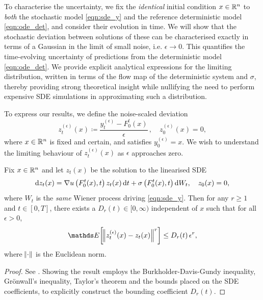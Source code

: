 To characterise the uncertainty, we fix the {\em identical} initial condition \(x  \in \mathbb{R}^n\) to {\em both} the stochastic model \eqref{eqn:sde_y} and the reference deterministic model \eqref{eqn:ode_det}, and consider their evolution in time.  We will show that the stochastic deviation between solutions of these can be characterised exactly in terms of a Gaussian in the limit of small noise, i.e. \(\epsilon \rightarrow 0\).  
This quantifies the time-evolving uncertainty of predictions from the deterministic model \eqref{eqn:ode_det}.
We provide explicit analytical expressions for the limiting distribution, written in terms of the flow map of the deterministic system and \(\sigma\), thereby providing strong theoretical insight while nullifying the need to perform 
expensive SDE simulations in approximating such a distribution.

To express our results, we define the noise-scaled deviation
\begin{equation}
	z_t^{(\epsilon)}(x) \coloneqq \frac{y_t^{(\epsilon)} - F_0^t(x)}{\epsilon} \, , \quad z_0^{(\epsilon)}(x) = 0,
	\label{eqn:z_def}
\end{equation}
where \(x \in \mathbb{R}^n\) is fixed and certain, and satisfies \(y_0^{(\epsilon)} = x\).
We wish to understand the limiting behaviour of \(z_t^{(\epsilon)}(x)\) as \(\epsilon\) approaches zero.

\begin{theorem}\label{thm:main}
Fix \(x \in \mathbb{R}^n\) and let \(z_t(x)\) be the solution to the linearised SDE 
\begin{equation}
\dif z_t(x) = \nabla u\left(F_0^t(x), t\right)z_t(x)\dif t + \sigma\left(F_0^t(x), t\right)\dif W_t, \quad z_0(x) = 0,
\label{eqn:limit_sde}
\end{equation}
where \(W_t\) is the \emph{same} Wiener process driving \eqref{eqn:sde_y}.
Then for any \(r \geq 1\) and \(t \in [0,T]\), there exists a \( D_r(t) \in [0, \infty) \) independent of \(x\) such that for all \(\epsilon > 0\),
	\begin{equation}
		\avg{\norm{z_t^{(\epsilon)}(x) - z_t(x)}^r} \leq D_r(t)\, \epsilon^r,
		\label{eqn:main_ineq}
	\end{equation}
 where \(\norm{\cdot}\) is the Euclidean norm.

\end{theorem}
\begin{proof}
	See .
	Showing the result employs the Burkholder-Davis-Gundy inequality, Gr\"onwall's inequality, Taylor's theorem and the bounds placed on the SDE coefficients, to explicitly construct the bounding coefficient \(D_r(t)\).
\end{proof}

